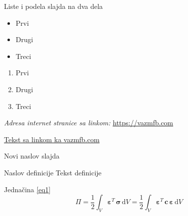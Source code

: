 \documentclass[12pt]{beamer}
\newcommand{\diff}[1]{\mathrm{d}#1}
\begin{document}
\begin{frame}{}
Liste i podela slajda na dva dela

\vspace{1cm} %

\begin{minipage}{0.49\textwidth}
    \begin{itemize}
    	\item Prvi 
    	\item Drugi
    	\item Treci
    \end{itemize}
\end{minipage}
\begin{minipage}{0.49\textwidth}
    \begin{enumerate}
    	\item Prvi 
    	\item Drugi
    	\item Treci
    \end{enumerate}
\end{minipage}

\vspace{1cm} %

\textit{Adresa internet stranice sa linkom:} %
\url{https://vazmfb.com}

\href{https://vazmfb.com}{Tekst sa linkom ka vazmfb.com}

\end{frame}

\begin{frame}{Novi naslov slajda}
\begin{vazmfb_block}{Naslov definicije}
    Tekst definicije
\end{vazmfb_block}

Jednačina \ref{eq1} %
\begin{equation}
    \label{eq1}
    \Pi = \frac{1}{2} \int_{V} \bm{\varepsilon}^T\, \bm{\sigma}\, \text{d}V = \frac{1}{2} \int_{V} \bm{\varepsilon}^T\, \bm{c}\, \bm{\varepsilon}\, \diff{V}
\end{equation}

\end{frame}
\end{document}
